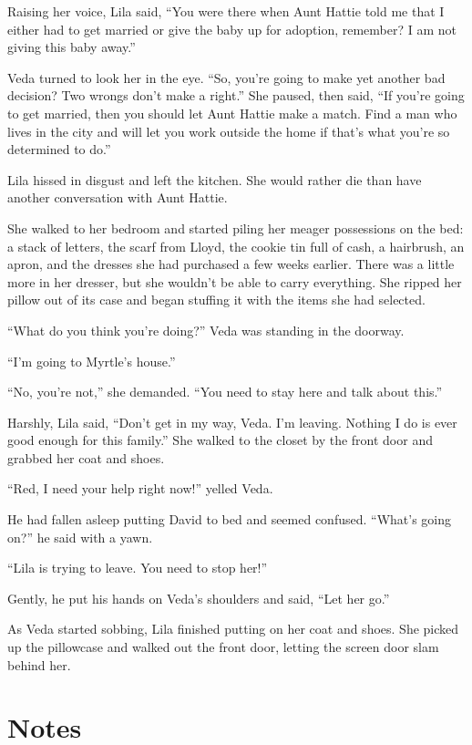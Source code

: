 \documentclass[
  american,
  letterpaper,
]{book}
\begin{document}
Raising her voice, Lila said, ``You were there when Aunt Hattie told me
that I either had to get married or give the baby up for adoption,
remember? I am not giving this baby away.''

Veda turned to look her in the eye. ``So, you're going to make yet
another bad decision? Two wrongs don't make a right.'' She paused, then
said, ``If you're going to get married, then you should let Aunt Hattie
make a match. Find a man who lives in the city and will let you work
outside the home if that's what you're so determined to do.''

Lila hissed in disgust and left the kitchen. She would rather die than
have another conversation with Aunt Hattie.

She walked to her bedroom and started piling her meager possessions on
the bed: a stack of letters, the scarf from Lloyd, the cookie tin full
of cash, a hairbrush, an apron, and the dresses she had purchased a few
weeks earlier. There was a little more in her dresser, but she wouldn't
be able to carry everything. She ripped her pillow out of its case and
began stuffing it with the items she had selected.

``What do you think you're doing?'' Veda was standing in the doorway.

``I'm going to Myrtle's house.''

``No, you're not,'' she demanded. ``You need to stay here and talk about
this.''

Harshly, Lila said, ``Don't get in my way, Veda. I'm leaving. Nothing I
do is ever good enough for this family.'' She walked to the closet by
the front door and grabbed her coat and shoes.

``Red, I need your help right now!'' yelled Veda.

He had fallen asleep putting David to bed and seemed confused. ``What's
going on?'' he said with a yawn.

``Lila is trying to leave. You need to stop her!''

Gently, he put his hands on Veda's shoulders and said, ``Let her go.''

As Veda started sobbing, Lila finished putting on her coat and shoes.
She picked up the pillowcase and walked out the front door, letting the
screen door slam behind her.

\section{Notes}\label{notes-35}
\end{document}
